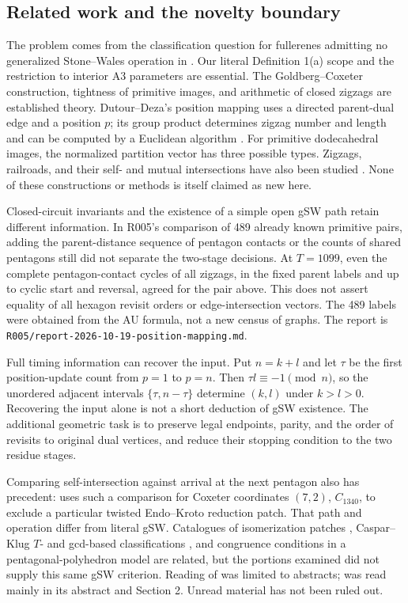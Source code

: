 \documentclass[11pt]{amsart}
\newcommand{\record}[1]{\nolinkurl{#1}}
\begin{document}
\subsection{Related work and the novelty boundary}
The problem comes from the classification question for fullerenes
admitting no generalized Stone--Wales operation in \cite{BBS}. Our
literal Definition 1(a) scope and the restriction to interior A3
parameters are essential. The Goldberg--Coxeter construction,
tightness of primitive images, and arithmetic of closed zigzags are
established theory. Dutour--Deza's position mapping uses a directed
parent-dual edge and a position $p$; its group product determines
zigzag number and length and can be computed by a Euclidean algorithm
\cite[Section 4, Theorems 4.5, 4.12, 6.5 and Proposition 4.14]{DD}.
For primitive dodecahedral images, the normalized partition vector has
three possible types. Zigzags, railroads, and their self- and mutual
intersections have also been studied \cite{ZZ,Knots}. None of these
constructions or methods is itself claimed as new here.

Closed-circuit invariants and the existence of a simple open gSW path
retain different information. In R005's comparison of 489 already
known primitive pairs, adding the parent-distance sequence of pentagon
contacts or the counts of shared pentagons still did not separate
the two-stage decisions. At $T=1099$, even the complete pentagon-contact
cycles of all zigzags, in the fixed parent labels and up to cyclic
start and reversal, agreed for the pair above. This does not assert
equality of all hexagon revisit orders or edge-intersection vectors.
The 489 labels were obtained from the AU formula, not a new census of
graphs. The report is \record{R005/report-2026-10-19-position-mapping.md}.

Full timing information can recover the input. Put $n=k+l$ and let
$\tau$ be the first position-update count from $p=1$ to $p=n$.
Then $\tau l\equiv-1\pmod n$, so the unordered adjacent intervals
$\{\tau,n-\tau\}$ determine $(k,l)$ under $k>l>0$.
Recovering the input alone is not a short deduction of gSW existence.
The additional geometric task is to preserve legal endpoints, parity,
and the order of revisits to original dual vertices, and reduce their
stopping condition to the two residue stages.

Comparing self-intersection against arrival at the next pentagon also
has precedent: \cite[Section 6, Fig.~5]{Growing} uses such a comparison
for Coxeter coordinates $(7,2)$, $C_{1340}$, to exclude a particular
twisted Endo--Kroto reduction patch. That path and operation differ from
literal gSW. Catalogues of isomerization patches \cite{Patches},
Caspar--Klug $T$- and gcd-based classifications \cite{Capsids}, and
congruence conditions in a pentagonal-polyhedron model \cite{Pentagonal}
are related, but the portions examined did not supply this same gSW
criterion. Reading of \cite{Patches,Knots} was limited to abstracts;
\cite{Pentagonal} was read mainly in its abstract and Section 2.
Unread material has not been ruled out.
\end{document}
